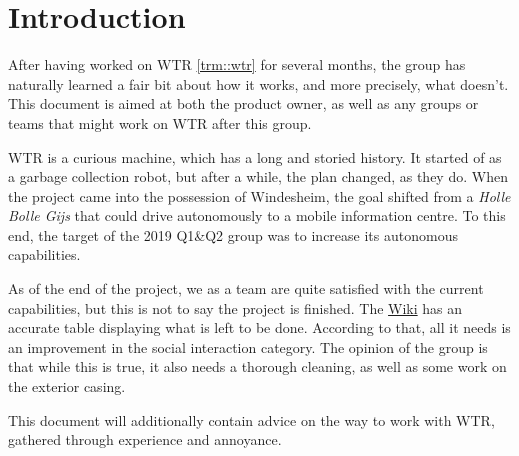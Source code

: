 \section{Introduction}
\label{sec::intro}
After having worked on WTR \ref{trm::wtr} for several months, the group has naturally learned a fair bit about how it works, and more precisely, what doesn't.
This document is aimed at both the product owner, as well as any groups or teams that might work on WTR after this group.

WTR is a curious machine, which has a long and storied history.
It started of as a garbage collection robot, but after a while, the plan changed, as they do.
When the project came into the possession of Windesheim, the goal shifted from a \textit{Holle Bolle Gijs} that could drive autonomously to a mobile information centre.
To this end, the target of the 2019 Q1\&Q2 group was to increase its autonomous capabilities.

As of the end of the project, we as a team are quite satisfied with the current capabilities, but this is not to say the project is finished.
The \href{https://windesheim-willy.github.io/WillyWiki/}{Wiki} has an accurate table displaying what is left to be done.
According to that, all it needs is an improvement in the social interaction category.
The opinion of the group is that while this is true, it also needs a thorough cleaning, as well as some work on the exterior casing.

This document will additionally contain advice on the way to work with WTR, gathered through experience and annoyance.
\newpage 